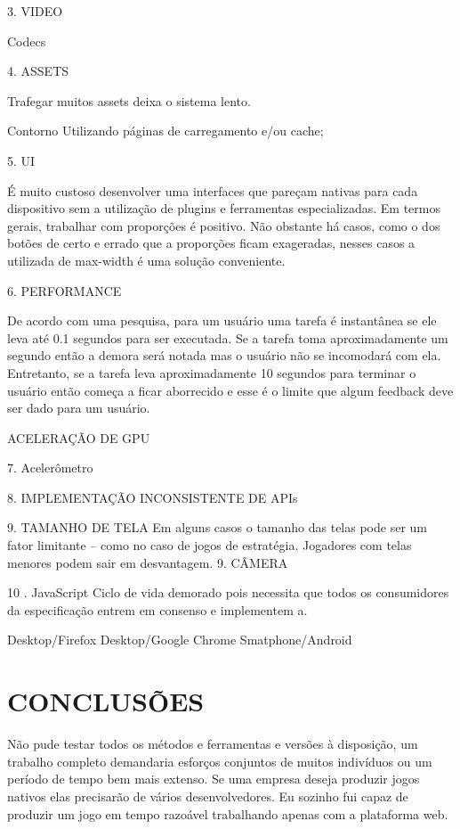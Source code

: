 \documentclass[11pt,a4paper]{article}
\begin{document}
3. VIDEO

Codecs

4. ASSETS

Trafegar muitos assets deixa o sistema lento.

 Contorno
Utilizando páginas de carregamento e/ou cache;

5. UI

É muito custoso desenvolver uma interfaces que pareçam nativas
para cada dispositivo sem a utilização de plugins e ferramentas
especializadas. Em termos gerais, trabalhar com proporções é
positivo. Não obstante
há casos, como o dos botões de certo e errado que a proporções ficam
exageradas, nesses casos a utilizada de max-width é uma solução
conveniente.

6. PERFORMANCE

De acordo com uma pesquisa, para um usuário uma tarefa é instantânea
se ele leva até 0.1 segundos para ser executada. Se a tarefa toma
aproximadamente um segundo então a demora será notada mas o
usuário não se incomodará com ela. Entretanto, se a tarefa leva
aproximadamente 10 segundos para terminar o usuário então começa a
ficar aborrecido e esse é o limite que algum feedback deve ser dado
para um usuário.

ACELERAÇÃO DE GPU

7. Acelerômetro

8. IMPLEMENTAÇÃO INCONSISTENTE DE APIs

9.  TAMANHO DE TELA
Em alguns casos o tamanho das telas pode ser um fator limitante – como
no caso de jogos de estratégia. Jogadores com telas menores podem sair
em desvantagem. 9. CÂMERA

10 . JavaScript
Ciclo de vida demorado pois necessita que todos os consumidores da
especificação entrem em consenso e implementem a.

Desktop/Firefox
Desktop/Google Chrome
Smatphone/Android

\section{CONCLUSÕES}

Não pude testar todos os métodos e ferramentas e versões à
disposição, um trabalho completo demandaria esforços conjuntos de
muitos indivíduos ou um período de tempo bem mais extenso. Se uma
empresa deseja produzir jogos nativos elas precisarão de vários
desenvolvedores. Eu sozinho fui capaz de produzir um jogo em tempo
razoável trabalhando apenas com a plataforma web.
\end{document}
